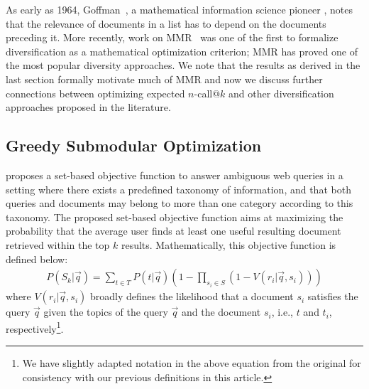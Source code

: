 As early as 1964, Goffman~\cite{goffman64OnRelevanceAsAMeasure}, a
mathematical information science pioneer \cite{harmon08RememberingWG},
notes that the relevance of documents in a list has to depend on the
documents preceding it.  More recently, work on
MMR~\cite{carbonell98MMR} was one of the first to formalize
diversification as a mathematical optimization criterion; MMR has
proved one of the most popular diversity approaches.  We note that the
results as derived in the last section formally motivate much of MMR and now
we discuss further connections between optimizing expected $n$-call@$k$ 
and other diversification approaches proposed in the literature.

\subsection{Greedy Submodular Optimization}


\cite{agrawal09diversifying} proposes a set-based objective function
to answer ambiguous web queries in a setting where there exists a
predefined taxonomy of information, and that both queries and
documents may belong to more than one category according to this
taxonomy. The proposed set-based objective function aims at maximizing
the probability that the average user finds at least one useful
resulting document retrieved within the top $k$
results. Mathematically, this objective function
is defined below:
%
\begin{align}
	P(S_k|\vec{q}) = \sum_{t\in T} P(t|\vec{q}) \left( 1 - \prod_{s_i\in S}(1-V(r_i| \vec{q}, s_i))\right) 
\label{eq:diversifykObjectiveFunction}
\end{align}
where $V(r_i| \vec{q}, s_i)$ broadly defines the
likelihood that a document $s_i$ satisfies the query $\vec{q}$ given the
topics of the query $\vec{q}$ and the document $s_i$, i.e., $t$ and $t_i$, respectively\footnote{We 
have slightly adapted notation in the above equation from the original 
for consistency with our previous definitions in this article.}.

